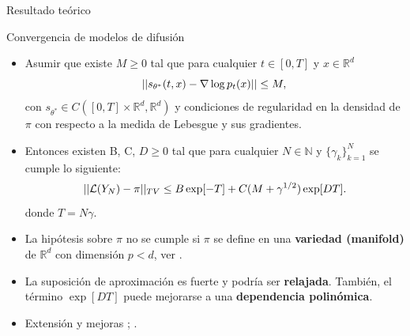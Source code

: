 \documentclass[aspectratio=169,xcolor=dvipsnames, t, spanish]{beamer}
\begin{document}
    \begin{frame}{Resultado teórico}\vspace{-6mm}
        \begin{block}{Convergencia de modelos de difusión \cite{DeBortoli2021a}}
            \begin{itemize}
                \item Asumir que existe $M\ge0$ tal que para cualquier $t\in[0,T]$ y $x\in\mathbb{R}^{d}$\vspace{-3mm}
                \[ ||s_{\theta^{*}}(t,x)-\nabla \log p_{t}(x)||\le M, \vspace{-3mm}\]
                con $s_{\theta^{*}}\in C([0,T]\times\mathbb{R}^{d},\mathbb{R}^{d})$ y condiciones de regularidad en la densidad de $\pi$ con respecto a la medida de Lebesgue y sus gradientes.
                \item Entonces existen B, C, $D\ge0$ tal que para cualquier $N\in\mathbb{N}$ y $\{\gamma_{k}\}_{k=1}^{N}$ se cumple lo siguiente:\vspace{-3mm}
                \[ ||\mathcal{L}(Y_{N})-\pi||_{TV}\le B\exp[-T]+C(M+\gamma^{1/2})\exp[DT]. \vspace{-2mm}\]
                donde $T=N\gamma.$
            \end{itemize}
        \end{block}
        \pause
        \scriptsize
        \begin{itemize}
            \item La hipótesis sobre $\pi$ no se cumple si $\pi$ se define en una \textbf{variedad (manifold)} de $\mathbb{R}^{d}$ con dimensión $p<d$, ver \cite{DeBortoli2022}.
            \item La suposición de aproximación es fuerte y podría ser \textbf{relajada}. También, el término $\exp[DT]$ puede mejorarse a una \textbf{dependencia polinómica}.
            \item Extensión y mejoras \cite{Lee2022}; \cite{Chen2022, Chen2023}.
        \end{itemize}
    \end{frame}
    
\end{document}
